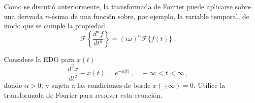 Como se discutió anteriormente, la transformada de Fourier puede aplicarse sobre una derivada $n$-ésima de una función sobre, por ejemplo, la variable temporal, de modo que se cumple la propiedad
\begin{equation}
\mathcal{F}\left\{ \frac{d^n f}{dt^n} \right\} = (i\omega)^n \mathcal{F}\{f(t)\} \ .
\end{equation}

\begin{ejemplo}
    Considere la EDO para $x(t)$
    \begin{equation}
        \frac{d^2 x}{dt^2} - x(t) = e^{-\alpha |t|} \ , \quad -\infty < t < \infty \ ,
    \end{equation}
    donde $\alpha > 0$, y sujeta a las condiciones de borde $x(\pm \infty) = 0$. Utilice la transformada de Fourier para resolver esta ecuación.
    

\end{ejemplo}
